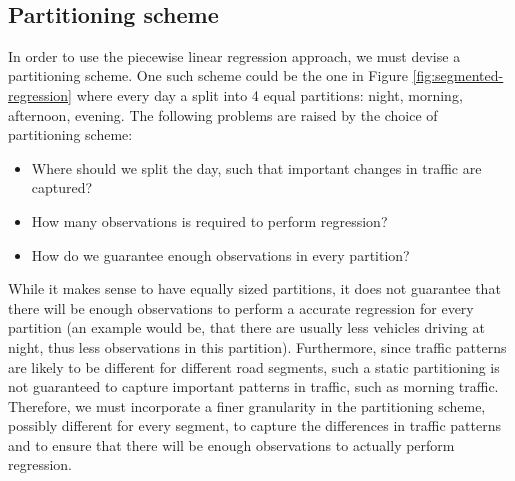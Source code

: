 %
\\
\subsection{Partitioning scheme}\label{patterns:segmentation}
In order to use the piecewise linear regression approach, we must devise a partitioning scheme. One such scheme could be the one in Figure \ref{fig:segmented-regression} where every day a split into 4 equal partitions: night, morning, afternoon, evening. The following problems are raised by the choice of partitioning scheme:
\begin{itemize}
	\item Where should we split the day, such that important changes in traffic are captured?
	\item How many observations is required to perform regression?
	\item How do we guarantee enough observations in every partition?
\end{itemize}
While it makes sense to have equally sized partitions, it does not guarantee that there will be enough observations to perform a accurate regression for every partition (an example would be, that there are usually less vehicles driving at night, thus less observations in this partition). Furthermore, since traffic patterns are likely to be different for different road segments, such a static partitioning is not guaranteed to capture important patterns in traffic, such as morning traffic. Therefore, we must incorporate a finer granularity in the partitioning scheme, possibly different for every segment, to capture the differences in traffic patterns and to ensure that there will be enough observations to actually perform regression.


